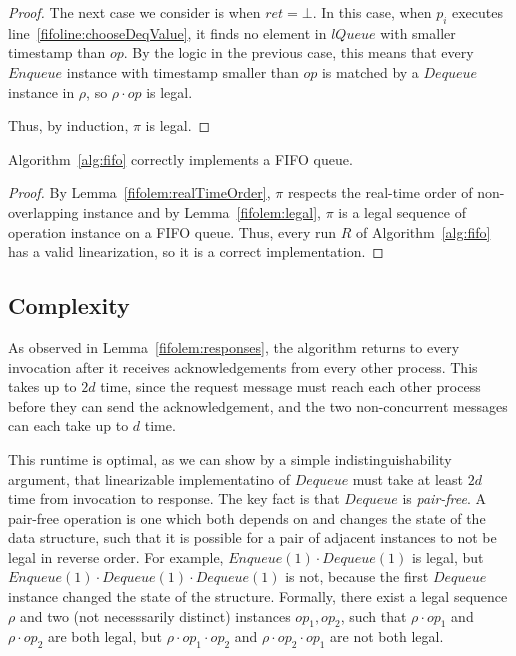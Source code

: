\documentclass[a4paper,anonymous,USenglish]{lipics-v2021}
\theoremstyle{definition}
\begin{document}
\begin{proof}
  The next case we consider is when $ret = \bot$.  In this case, when $p_i$ executes line~\ref{fifoline:chooseDeqValue}, it finds no element in $lQueue$ with smaller timestamp than $op$.  By the logic in the previous case, this means that every $Enqueue$ instance with timestamp smaller than $op$ is matched by a $Dequeue$ instance in $\rho$, so $\rho \cdot op$ is legal.

  Thus, by induction, $\pi$ is legal.
\end{proof}


\begin{theorem}
  Algorithm~\ref{alg:fifo} correctly implements a FIFO queue.
\end{theorem}

\begin{proof}
  By Lemma~\ref{fifolem:realTimeOrder}, $\pi$ respects the real-time order of non-overlapping instance and by Lemma~\ref{fifolem:legal}, $\pi$ is a legal sequence of operation instance on a FIFO queue.  Thus, every run $R$ of Algorithm~\ref{alg:fifo} has a valid linearization, so it is a correct implementation.
\end{proof}
 

\subsection{Complexity}

As observed in Lemma~\ref{fifolem:responses}, the algorithm returns to every invocation after it receives acknowledgements from every other process.  This takes up to $2d$ time, since the request message must reach each other process before they can send the acknowledgement, and the two non-concurrent messages can each take up to $d$ time.

This runtime is optimal, as we can show by a simple indistinguishability argument, that linearizable implementatino of $Dequeue$ must take at least $2d$ time from invocation to response.  The key fact is that $Dequeue$ is \emph{pair-free}.  A pair-free operation \cite{WangTalmageLeeWelch18} is one which both depends on and changes the state of the data structure, such that it is possible for a pair of adjacent instances to not be legal in reverse order.  For example, $Enqueue(1) \cdot Dequeue(1)$ is legal, but $Enqueue(1) \cdot Dequeue(1) \cdot Dequeue(1)$ is not, because the first $Dequeue$ instance changed the state of the structure.  Formally, there exist a legal sequence $\rho$ and two (not necesssarily distinct) instances $op_1, op_2$, such that $\rho \cdot op_1$ and $\rho \cdot op_2$ are both legal, but $\rho \cdot op_1 \cdot op_2$ and $\rho \cdot op_2 \cdot op_1$ are not both legal.
\end{document}
